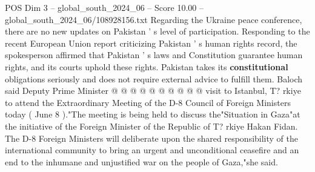 \begin{textsample}{POS Dim 3 – global\_south\_2024\_06 – Score 10.00 – global\_south\_2024\_06/108928156.txt}
Regarding the Ukraine peace conference, there are no new updates on Pakistan ' s level of participation.
Responding to the recent European Union report criticizing Pakistan ' s human rights record, the spokesperson affirmed that Pakistan ' s laws and Constitution guarantee human rights, and its courts uphold these rights.
Pakistan takes its \textbf{constitutional} obligations seriously and does not require external advice to fulfill them.
Baloch said Deputy Prime Minister @ @ @ @ @ @ @ @ @ @ visit to Istanbul, T? rkiye to attend the Extraordinary Meeting of the D-8 Council of Foreign Ministers today ( June 8 )."The meeting is being held to discuss the"Situation in Gaza"at the initiative of the Foreign Minister of the Republic of T? rkiye Hakan Fidan.
The D-8 Foreign Ministers will deliberate upon the shared responsibility of the international community to bring an urgent and unconditional ceasefire and an end to the inhumane and unjustified war on the people of Gaza,"she said.

\end{textsample}

